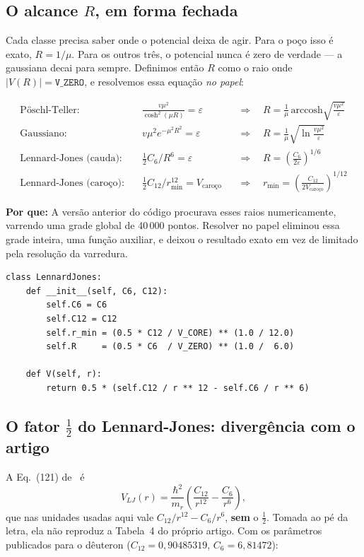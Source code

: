 \documentclass[11pt,a4paper]{article}
\newcommand{\pq}[1]{\medskip\noindent\textbf{Por que:} #1\medskip}
\begin{document}
\subsection{O alcance $R$, em forma fechada}

Cada classe precisa saber onde o potencial deixa de agir. Para o poço isso é
exato, $R = 1/\mu$. Para os outros três, o potencial nunca é zero de verdade ---
a gaussiana decai para sempre. Definimos então $R$ como o raio onde
$|V(R)| = \texttt{V\_ZERO}$, e resolvemos essa equação \emph{no papel}:

\begin{align}
  \text{Pöschl-Teller:}&\quad \frac{v\mu^2}{\cosh^2(\mu R)} = \varepsilon
    &&\Longrightarrow\quad R = \frac{1}{\mu}\,\mathrm{arccosh}\!\sqrt{\frac{v\mu^2}{\varepsilon}}\\
  \text{Gaussiano:}&\quad v\mu^2 e^{-\mu^2R^2} = \varepsilon
    &&\Longrightarrow\quad R = \frac{1}{\mu}\sqrt{\ln\frac{v\mu^2}{\varepsilon}}\\
  \text{Lennard-Jones (cauda):}&\quad \tfrac12 C_6/R^6 = \varepsilon
    &&\Longrightarrow\quad R = \left(\frac{C_6}{2\varepsilon}\right)^{1/6}\\
  \text{Lennard-Jones (caroço):}&\quad \tfrac12 C_{12}/r_{\min}^{12} = V_{\text{caroço}}
    &&\Longrightarrow\quad r_{\min} = \left(\frac{C_{12}}{2V_{\text{caroço}}}\right)^{1/12}
\end{align}

\pq{A versão anterior do código procurava esses raios numericamente, varrendo uma
grade global de 40\,000 pontos. Resolver no papel eliminou essa grade inteira,
uma função auxiliar, e deixou o resultado exato em vez de limitado pela
resolução da varredura.}

\begin{lstlisting}
class LennardJones:
    def __init__(self, C6, C12):
        self.C6 = C6
        self.C12 = C12
        self.r_min = (0.5 * C12 / V_CORE) ** (1.0 / 12.0)
        self.R     = (0.5 * C6  / V_ZERO) ** (1.0 /  6.0)

    def V(self, r):
        return 0.5 * (self.C12 / r ** 12 - self.C6 / r ** 6)
\end{lstlisting}

\subsection*{O fator $\tfrac12$ do Lennard-Jones: divergência com o artigo}

A Eq.~(121) de~\cite{rbef} é
\[ V_{LJ}(r) = \frac{\hbar^2}{m_r}\left(\frac{C_{12}}{r^{12}} - \frac{C_6}{r^6}\right), \]
que nas unidades usadas aqui vale $C_{12}/r^{12}-C_6/r^6$, \textbf{sem} o
$\tfrac12$. Tomada ao pé da letra, ela não reproduz a Tabela~4 do próprio
artigo. Com os parâmetros publicados para o dêuteron ($C_{12}=0{,}90485319$,
$C_6=6{,}81472$):
\end{document}
